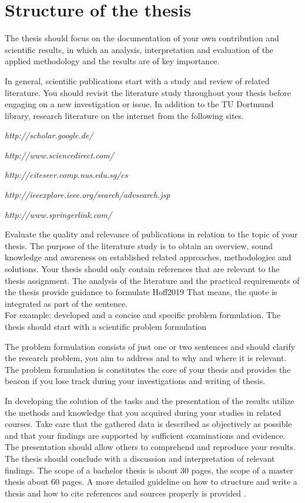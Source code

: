 \chapter{Structure of the thesis}
\label{aufbau}

The thesis should focus on the documentation of your own contribution and scientific results, in which an analysis, interpretation and evaluation of the applied methodology and the results are of key importance.

In general, scientific publications start with a study and review of related literature.
You should revisit the literature study throughout your thesis before engaging on a new
investigation or issue.
In addition to the TU Dortmund library, research literature on the internet from the following sites.

\emph{http://scholar.google.de/}

\emph{http://www.sciencedirect.com/}

\emph{http://citeseer.comp.nus.edu.sg/cs}

\emph{http://ieeexplore.ieee.org/search/advsearch.jsp}

\emph{http://www.springerlink.com/}

Evaluate the quality and relevance of publications in relation to the topic of your
thesis.
The purpose of the literature study is to obtain an overview, sound knowledge and awareness on established related approaches, methodologies and solutions. 
Your thesis should only contain references that are relevant to the thesis assignment.
The analysis of the literature and the practical requirements of the thesis provide 
guidance to formulate  \Textcite
{hum1}{Hoff2019} \textcite{TuDo2}
That means, the quote is integrated as part of the sentence. \\
For example: \textcite[S. 123 ff.]{Book3} developed and \cite{hum1} a concise and specific problem formulation.
The thesis should start with a scientific problem formulation

The problem formulation consists of just one or two sentences and should clarify the research problem, you aim to address and to why and where it is relevant. The problem formulation is constitutes the core of your thesis and provides the beacon if you lose track during your investigations and writing of thesis.

In developing the solution of the tasks and the presentation of the results utilize the methods and knowledge that you acquired during your studies in related courses.
Take care that the gathered data is described as objectively as possible and that your findings are supported by sufficient examinations and evidence.
The presentation should allow others to comprehend and reproduce your results.
The thesis should conclude with a discussion and interpretation of relevant findings.
The scope of a bachelor thesis is about 30 pages, the scope of a master thesis about 60 pages.
A more detailed guideline on how to structure and write a thesis and how to cite references and sources properly is provided \textcite{Leit1}.

